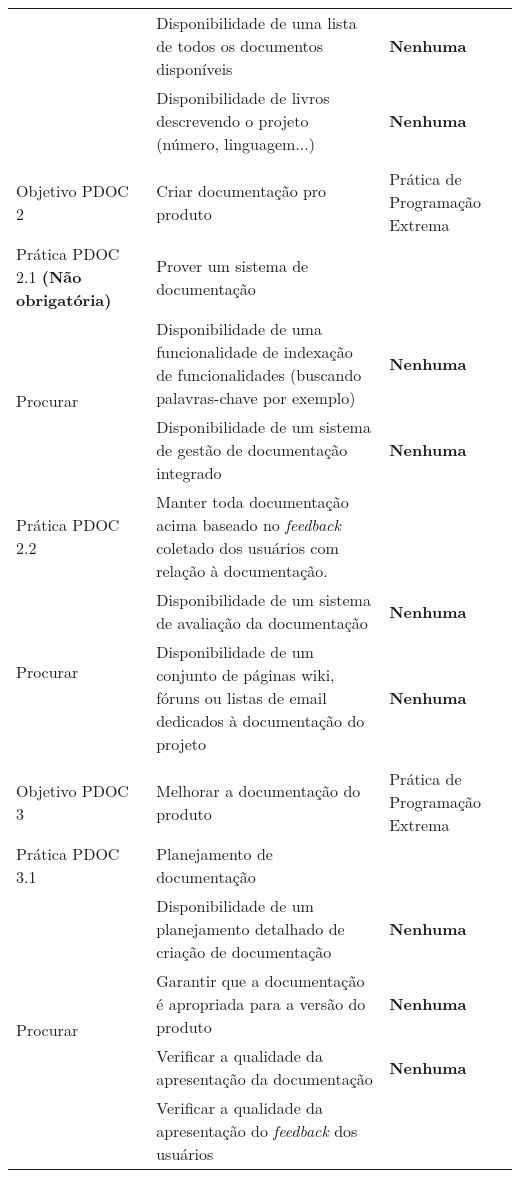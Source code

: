 \begin{longtable}{|p{2cm}|p{7cm}|p{7cm}|}
  \cline{2-3} & Disponibilidade de uma lista de todos os documentos
  disponíveis &
  \textbf{Nenhuma} \\
  \cline{2-3} & Disponibilidade de livros descrevendo o projeto
  (número, linguagem...) &
  \textbf{Nenhuma} \\
  \hline
  & & \\
  \hline \cellcolor[gray]{0.6} Objetivo PDOC 2 & \cellcolor[gray]{0.6}
  Criar documentação pro produto & Prática de Programação Extrema \\
  \hline \cellcolor[gray]{0.9} Prática PDOC 2.1 \textbf{(Não
    obrigatória)} & \cellcolor[gray]{0.9}
  Prover um sistema de documentação & \\
  \hline \multirow{2}{*}{Procurar} & Disponibilidade de uma
  funcionalidade de indexação de funcionalidades (buscando
  palavras-chave por exemplo) &
  \textbf{Nenhuma} \\
  \cline{2-3} & Disponibilidade de um sistema de gestão de
  documentação integrado &
  \textbf{Nenhuma} \\
  \hline \cellcolor[gray]{0.9} Prática PDOC 2.2 &
  \cellcolor[gray]{0.9} Manter toda documentação acima baseado no
  \textit{feedback}
  coletado dos usuários com relação à documentação. & \\
  \hline \multirow{2}{*}{Procurar} & Disponibilidade de um sistema de
  avaliação da documentação &
  \textbf{Nenhuma} \\
  \cline{2-3} & Disponibilidade de um conjunto de páginas wiki, fóruns
  ou listas de email dedicados à documentação do projeto&
  \textbf{Nenhuma} \\
  \hline
  & & \\
  \hline \cellcolor[gray]{0.6} Objetivo PDOC 3 & \cellcolor[gray]{0.6}
  Melhorar a documentação do produto & Prática de Programação Extrema \\
  \hline \cellcolor[gray]{0.9} Prática PDOC 3.1 &
  \cellcolor[gray]{0.9}
  Planejamento de documentação & \\
  \hline \multirow{4}{*}{Procurar} & Disponibilidade de um
  planejamento detalhado de criação de documentação &
  \textbf{Nenhuma} \\
  \cline{2-3} & Garantir que a documentação é apropriada para a versão
  do produto &
  \textbf{Nenhuma} \\
  \cline{2-3} & Verificar a qualidade da apresentação da documentação
  &
  \textbf{Nenhuma} \\
  \cline{2-3} & Verificar a qualidade da apresentação do
  \textit{feedback} dos usuários &

\end{longtable}
